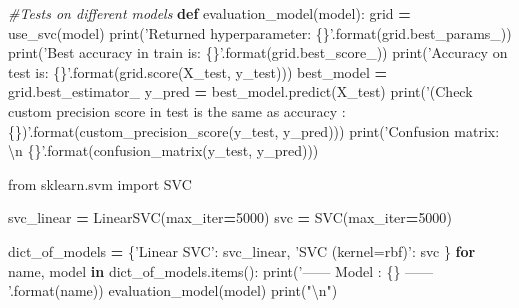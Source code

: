 \documentclass[10pt,a4paper]{article}
\newenvironment{Shaded}{\begin{snugshade}}{\end{snugshade}}
\newcommand{\BuiltInTok}[1]{#1}
\newcommand{\CharTok}[1]{\textcolor[rgb]{0.31,0.60,0.02}{#1}}
\newcommand{\CommentTok}[1]{\textcolor[rgb]{0.56,0.35,0.01}{\textit{#1}}}
\newcommand{\ControlFlowTok}[1]{\textcolor[rgb]{0.13,0.29,0.53}{\textbf{#1}}}
\newcommand{\DecValTok}[1]{\textcolor[rgb]{0.00,0.00,0.81}{#1}}
\newcommand{\ImportTok}[1]{#1}
\newcommand{\KeywordTok}[1]{\textcolor[rgb]{0.13,0.29,0.53}{\textbf{#1}}}
\newcommand{\NormalTok}[1]{#1}
\newcommand{\OperatorTok}[1]{\textcolor[rgb]{0.81,0.36,0.00}{\textbf{#1}}}
\newcommand{\SpecialCharTok}[1]{\textcolor[rgb]{0.00,0.00,0.00}{#1}}
\newcommand{\StringTok}[1]{\textcolor[rgb]{0.31,0.60,0.02}{#1}}
\theoremstyle{break}
\begin{document}
\begin{Shaded}
\begin{Highlighting}[]
\CommentTok{#Tests on different models}
\KeywordTok{def}\NormalTok{ evaluation_model(model):}
\NormalTok{    grid }\OperatorTok{=}\NormalTok{ use_svc(model)}
    \BuiltInTok{print}\NormalTok{(}\StringTok{'Returned hyperparameter: }\SpecialCharTok{\{\}}\StringTok{'}\NormalTok{.}\BuiltInTok{format}\NormalTok{(grid.best_params_))}
    \BuiltInTok{print}\NormalTok{(}\StringTok{'Best accuracy in train is: }\SpecialCharTok{\{\}}\StringTok{'}\NormalTok{.}\BuiltInTok{format}\NormalTok{(grid.best_score_))}
    \BuiltInTok{print}\NormalTok{(}\StringTok{'Accuracy on test is: }\SpecialCharTok{\{\}}\StringTok{'}\NormalTok{.}\BuiltInTok{format}\NormalTok{(grid.score(X_test, y_test)))}
\NormalTok{    best_model }\OperatorTok{=}\NormalTok{ grid.best_estimator_}
\NormalTok{    y_pred }\OperatorTok{=}\NormalTok{ best_model.predict(X_test)}
    \BuiltInTok{print}\NormalTok{(}\StringTok{'(Check custom precision score in test is the same as accuracy : }\SpecialCharTok{\{\}}\StringTok{)'}\NormalTok{.}\BuiltInTok{format}\NormalTok{(custom_precision_score(y_test, y_pred)))}
    \BuiltInTok{print}\NormalTok{(}\StringTok{'Confusion matrix: }\CharTok{\textbackslash{}n}\StringTok{ }\SpecialCharTok{\{\}}\StringTok{'}\NormalTok{.}\BuiltInTok{format}\NormalTok{(confusion_matrix(y_test, y_pred)))}
\end{Highlighting}
\end{Shaded}

\begin{Shaded}
\begin{Highlighting}[]
\ImportTok{from}\NormalTok{ sklearn.svm }\ImportTok{import}\NormalTok{ SVC}

\NormalTok{svc_linear }\OperatorTok{=}\NormalTok{ LinearSVC(max_iter}\OperatorTok{=}\DecValTok{5000}\NormalTok{)}
\NormalTok{svc }\OperatorTok{=}\NormalTok{ SVC(max_iter}\OperatorTok{=}\DecValTok{5000}\NormalTok{)}

\NormalTok{dict_of_models }\OperatorTok{=}\NormalTok{ \{}\StringTok{'Linear SVC'}\NormalTok{: svc_linear,}
                  \StringTok{'SVC (kernel=rbf)'}\NormalTok{: svc}
\NormalTok{                  \}}
\ControlFlowTok{for}\NormalTok{ name, model }\KeywordTok{in}\NormalTok{ dict_of_models.items():}
    \BuiltInTok{print}\NormalTok{(}\StringTok{'------ Model : }\SpecialCharTok{\{\}}\StringTok{ ------ '}\NormalTok{.}\BuiltInTok{format}\NormalTok{(name))}
\NormalTok{    evaluation_model(model)}
    \BuiltInTok{print}\NormalTok{(}\StringTok{"}\CharTok{\textbackslash{}n}\StringTok{"}\NormalTok{)}
\end{Highlighting}
\end{Shaded}
\end{document}
